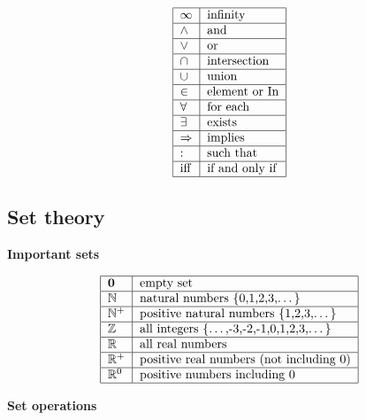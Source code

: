 \documentclass[justified,sixbynine]{tufte-book}
\def\subsubsection#1{{\bf #1}}
\theoremstyle{plain}%
\theoremstyle{definition}
\theoremstyle{remark}
\begin{document}
\begin{fullwidth}
\begin{equation}
\begin{tabular}{|l|l|}
\hline
$\infty $ & infinity \\ \hline
$\wedge $ & and \\ \hline
$\vee $ & or \\ \hline
$\cap $ & intersection \\ \hline
$\cup $ & union \\ \hline
$\in $ & element or In \\ \hline
$\forall $ & for each \\ \hline
$\exists $ & exists \\ \hline
$\Rightarrow $ & implies \\ \hline
: & such that \\ \hline
iff & if and only if \\ \hline
\end{tabular}
\end{equation}

\goodbreak\subsection{Set theory}

\subsubsection{Important sets}

\begin{equation}
\begin{tabular}{|l|l|}
\hline
${\bf 0}$ & empty set \\ \hline
${\Bbb N}$ & natural numbers \{0,1,2,3,\dots\} \\ \hline
${\Bbb N}^{+}$ & positive natural numbers \{1,2,3,\dots\} \\ \hline
${\Bbb Z}$ & all integers \{\dots,-3,-2,-1,0,1,2,3,\dots\} \\ \hline
${\Bbb R}$ & all real numbers \\ \hline
${\Bbb R}^{+}$ & positive real numbers (not including 0) \\ \hline
${\Bbb R}^{0}$ & positive numbers including 0 \\ \hline
\end{tabular}
\end{equation}

\subsubsection{Set operations}


\end{fullwidth}
\end{document}
